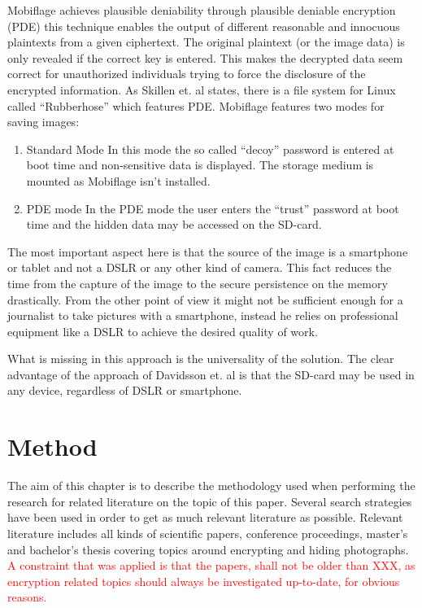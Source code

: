 \documentclass[12pt,a4paper,titlepage,oneside]{scrartcl}
\newcommand\todo[1]{\textcolor{red}{#1}}
\begin{document}
Mobiflage achieves plausible deniability through plausible deniable encryption (PDE) this technique enables the output of different reasonable and innocuous plaintexts from a given ciphertext.
The original plaintext (or the image data) is only revealed if the correct key is entered.
This makes the decrypted data seem correct for unauthorized individuals trying to force the disclosure of the encrypted information.
As Skillen et. al states, there is a file system for Linux called ``Rubberhose'' which features PDE.
Mobiflage features two modes for saving images: 
\begin{enumerate}
  \item Standard Mode
  In this mode the so called ``decoy'' password is entered at boot time and non-sensitive data is displayed.
  The storage medium is mounted as Mobiflage isn't installed.
  \item PDE mode
  In the PDE mode the user enters the ``trust'' password at boot time and the hidden data may be accessed on the SD-card.
\end{enumerate}

The most important aspect here is that the source of the image is a smartphone or tablet and not a DSLR or any other kind of camera.
This fact reduces the time from the capture of the image to the secure persistence on the memory drastically.
From the other point of view it might not be sufficient enough for a journalist to take pictures with a smartphone, instead he relies on professional equipment like a DSLR to achieve the desired quality of work.

What is missing in this approach is the universality of the solution.
The clear advantage of the approach of Davidsson et. al \cite{Davidsson2016} is that the SD-card may be used in any device, regardless of DSLR or smartphone.

\newpage
\section{Method}
The aim of this chapter is to describe the methodology used when performing the research for related literature on the topic of this paper.
Several search strategies have been used in order to get as much relevant literature as possible.
Relevant literature includes all kinds of scientific papers, conference proceedings, master's and bachelor's thesis covering topics around encrypting and hiding photographs.
\todo{A constraint that was applied is that the papers, shall not be older than XXX, as encryption related topics should always be investigated up-to-date, for obvious reasons.}
\end{document}
